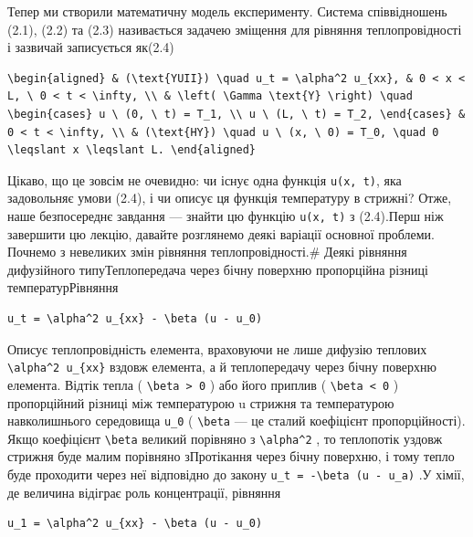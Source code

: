 \documentclass[
  ukrainian,
]{article}
\begin{document}
Тепер ми створили математичну модель експерименту. Система співвідношень
(2.1), (2.2) та (2.3) називається задачею зміщення для рівняння
теплопровідності і зазвичай записується як(2.4)

\begin{verbatim}
\begin{aligned} & (\text{YUII}) \quad u_t = \alpha^2 u_{xx}, & 0 < x < L, \ 0 < t < \infty, \\ & \left( \Gamma \text{Y} \right) \quad \begin{cases} u \ (0, \ t) = T_1, \\ u \ (L, \ t) = T_2, \end{cases} & 0 < t < \infty, \\ & (\text{HY}) \quad u \ (x, \ 0) = T_0, \quad 0 \leqslant x \leqslant L. \end{aligned}
\end{verbatim}

Цікаво, що це зовсім не очевидно: чи існує одна функція
\texttt{u(x,\ t)}, яка задовольняє умови (2.4), і чи описує ця функція
температуру в стрижні? Отже, наше безпосереднє завдання --- знайти цю
функцію \texttt{u(x,\ t)} з (2.4).Перш ніж завершити цю лекцію, давайте
розглянемо деякі варіації основної проблеми. Почнемо з невеликих змін
рівняння теплопровідності.\# Деякі рівняння дифузійного
типуТеплопередача через бічну поверхню пропорційна різниці
температурРівняння

\begin{verbatim}
u_t = \alpha^2 u_{xx} - \beta (u - u_0)
\end{verbatim}

Описує теплопровідність елемента, враховуючи не лише дифузію теплових
\texttt{\textbackslash{}alpha\^{}2\ u\_\{xx\}} вздовж елемента, а й
теплопередачу через бічну поверхню елемента. Відтік тепла (
\texttt{\textbackslash{}beta\ \textgreater{}\ 0} ) або його приплив (
\texttt{\textbackslash{}beta\ \textless{}\ 0} ) пропорційний різниці між
температурою u стрижня та температурою навколишнього середовища
\texttt{u\_0} ( \texttt{\textbackslash{}beta} --- це сталий коефіцієнт
пропорційності). Якщо коефіцієнт \texttt{\textbackslash{}beta} великий
порівняно з \texttt{\textbackslash{}alpha\^{}2} , то теплопотік уздовж
стрижня буде малим порівняно зПротікання через бічну поверхню, і тому
тепло буде проходити через неї відповідно до закону
\texttt{u\_t\ =\ -\textbackslash{}beta\ (u\ -\ u\_a)} .У хімії, де
величина відіграє роль концентрації, рівняння

\begin{verbatim}
u_1 = \alpha^2 u_{xx} - \beta (u - u_0)
\end{verbatim}
\end{document}
